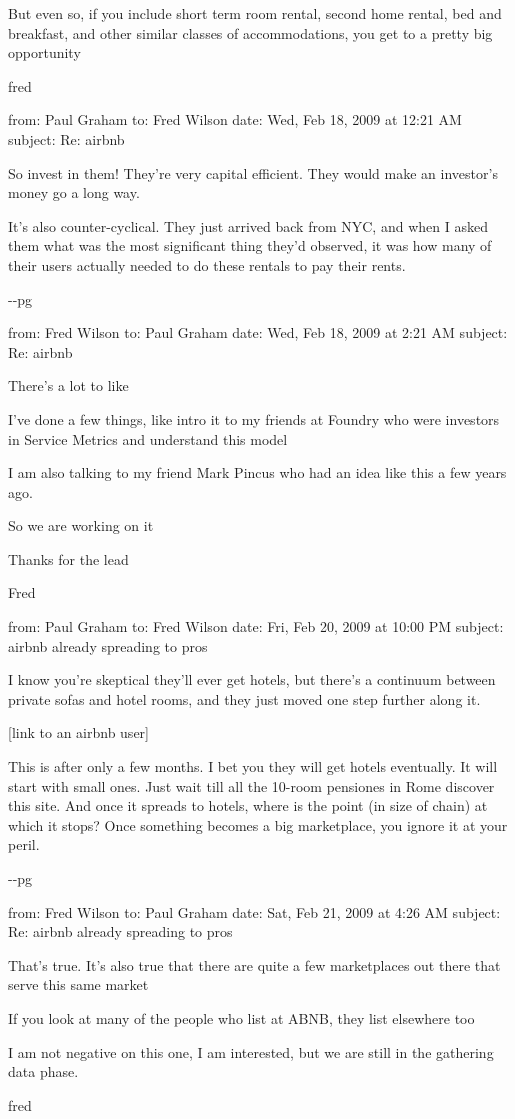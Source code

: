 But even so, if you include short term room rental, second home rental,
bed and breakfast, and other similar classes of accommodations, you get
to a pretty big opportunity

fred

from: Paul Graham to: Fred Wilson date: Wed, Feb 18, 2009 at 12:21 AM
subject: Re: airbnb

So invest in them! They're very capital efficient. They would make an
investor's money go a long way.

It's also counter-cyclical. They just arrived back from NYC, and when I
asked them what was the most significant thing they'd observed, it was
how many of their users actually needed to do these rentals to pay their
rents.

-\/-pg

from: Fred Wilson to: Paul Graham date: Wed, Feb 18, 2009 at 2:21 AM
subject: Re: airbnb

There's a lot to like

I've done a few things, like intro it to my friends at Foundry who were
investors in Service Metrics and understand this model

I am also talking to my friend Mark Pincus who had an idea like this a
few years ago.

So we are working on it

Thanks for the lead

Fred

from: Paul Graham to: Fred Wilson date: Fri, Feb 20, 2009 at 10:00 PM
subject: airbnb already spreading to pros

I know you're skeptical they'll ever get hotels, but there's a continuum
between private sofas and hotel rooms, and they just moved one step
further along it.

{[}link to an airbnb user{]}

This is after only a few months. I bet you they will get hotels
eventually. It will start with small ones. Just wait till all the
10-room pensiones in Rome discover this site. And once it spreads to
hotels, where is the point (in size of chain) at which it stops? Once
something becomes a big marketplace, you ignore it at your peril.

-\/-pg

from: Fred Wilson to: Paul Graham date: Sat, Feb 21, 2009 at 4:26 AM
subject: Re: airbnb already spreading to pros

That's true. It's also true that there are quite a few marketplaces out
there that serve this same market

If you look at many of the people who list at ABNB, they list elsewhere
too

I am not negative on this one, I am interested, but we are still in the
gathering data phase.

fred
